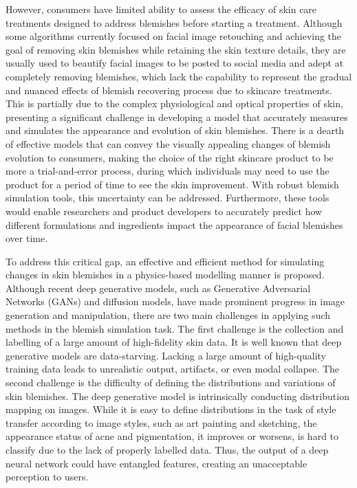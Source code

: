 \begin{spacing}{1.5}
However, consumers have limited ability to assess the efficacy of skin care treatments designed to address blemishes before starting a treatment\cite{doi:10.2352/EI.2023.35.7.IMAGE-276}. Although some algorithms currently focused on facial image retouching and achieving the goal of removing skin blemishes while retaining the skin texture details, they are usually used to beautify facial images to be posted to social media \cite{xieBlemishawareProgressiveFace2023, linExemplarbasedFreckleRetouching2019, shafaeiAutoRetouchAutomaticProfessional2021} and adept at completely removing blemishes, which lack the capability to represent the gradual and nuanced effects of blemish recovering process due to skincare treatments. This is partially due to the complex physiological and optical properties of skin, presenting a significant challenge in developing a model that accurately measures and simulates the appearance and evolution of skin blemishes. There is a dearth of effective models that can convey the visually appealing changes of blemish evolution to consumers, making the choice of the right skincare product to be more a trial-and-error process, during which individuals may need to use the product for a period of time to see the skin improvement. With robust blemish simulation tools, this uncertainty can be addressed. Furthermore, these tools would enable researchers and product developers to accurately predict how different formulations and ingredients impact the appearance of facial blemishes over time.

To address this critical gap, an effective and efficient method for simulating changes in skin blemishes in a physics-based modelling manner is proposed. Although recent deep generative models, such as Generative Adversarial Networks\cite{goodfellowGenerativeAdversarialNetworks2014} (GANs) and diffusion models\cite{DBLP:conf/nips/HoJA20,rombach2021highresolution}, have made prominent progress in image generation and manipulation, there are two main challenges in applying such methods in the blemish simulation task. The first challenge is the collection and labelling of a large amount of high-fidelity skin data. It is well known that deep generative models are data-starving. Lacking a large amount of high-quality training data leads to unrealistic output, artifacts, or even modal collapse. The second challenge is the difficulty of defining the distributions and variations of skin blemishes. The deep generative model is intrinsically conducting distribution mapping on images. While it is easy to define distributions in the task of style transfer\cite{DBLP:conf/iclr/DumoulinSK17,DBLP:conf/iccv/ZhuPIE17, DBLP:journals/corr/GatysEB15a} according to image styles, such as art painting and sketching, the appearance status of acne and pigmentation, it improves or worsens, is hard to classify due to the lack of properly labelled data. Thus, the output of a deep neural network could have entangled features, creating an unacceptable perception to users.


\end{spacing}
